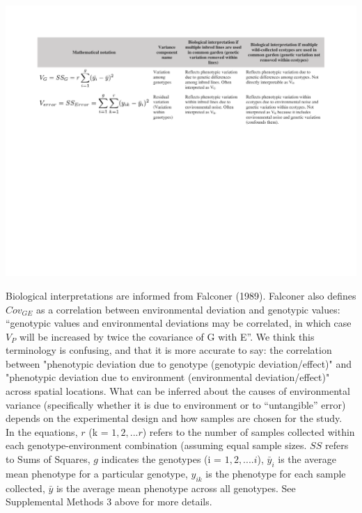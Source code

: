 \documentclass[11pt, oneside]{amsart}
\begin{document}
\renewcommand\thefigure{T2}
\begin{table}[h]
\begin{center}
\includegraphics[width=7.5in]{Figs/SuppTable2_VarianceforCommonGarden.pdf}
\end{center}
\label{Table: Variance Components - Single common garden design}
\caption[Biological interpretations of variance components from a single common garden with multiple “genotypes”.]{ Biological interpretations are informed from Falconer (1989). Falconer also defines $Cov_{GE}$ as a correlation between environmental deviation and genotypic values: “genotypic values and environmental deviations may be correlated, in which case $V_P$ will be increased by twice the covariance of G with E”. We think this terminology is confusing, and that it is more accurate to say: the correlation between "phenotypic deviation due to genotype (genotypic deviation/effect)" and "phenotypic deviation due to environment (environmental deviation/effect)" across spatial locations. What can be inferred about the causes of environmental variance (specifically whether it is due to environment or to “untangible” error) depends on the experimental design and how samples are chosen for the study.\\

In the equations, $r$ (k = $1, 2, ...r$) refers to the number of samples collected within each genotype-environment combination (assuming equal sample sizes. $SS$ refers to Sums of Squares, $g$ indicates the genotypes (i = $1,2,....i$), $\bar{y}_{i}$ is the average mean phenotype for a particular genotype, $y_{ik}$ is the phenotype for each sample collected, $\bar{y}$ is the average mean phenotype across all genotypes. See Supplemental Methods 3 above for more details.} 
\end{table}
 
\end{document}
